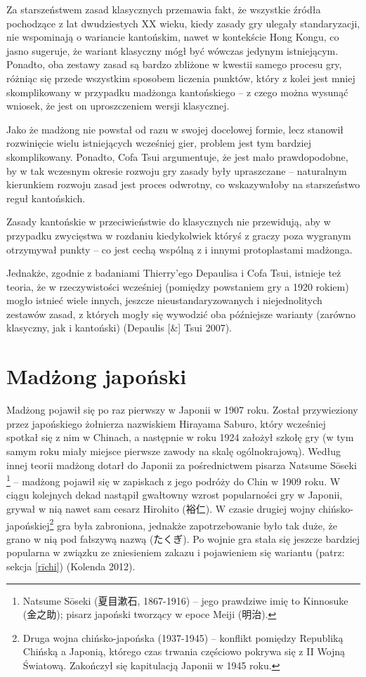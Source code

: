 Za starszeństwem zasad klasycznych przemawia fakt, że wszystkie źródła
pochodzące z lat dwudziestych XX wieku, kiedy zasady gry ulegały standaryzacji,
nie wspominają o wariancie kantońskim, nawet w kontekście Hong Kongu,
co jasno sugeruje, że wariant klasyczny mógł być wówczas jedynym istniejącym.
Ponadto, oba zestawy zasad są bardzo zbliżone w kwestii samego procesu gry,
różniąc się przede wszystkim sposobem liczenia punktów, który z kolei jest mniej
skomplikowany w przypadku madżonga kantońskiego -- z czego można wysunąć
wniosek, że jest on uproszczeniem wersji klasycznej.

Jako że madżong nie powstał od razu w swojej docelowej formie, lecz stanowił
rozwinięcie wielu istniejących wcześniej gier, problem jest tym bardziej
skomplikowany. Ponadto, Cofa Tsui argumentuje, że jest mało prawdopodobne, by w
tak wczesnym okresie rozwoju gry zasady były upraszczane -- naturalnym
kierunkiem rozwoju zasad jest proces odwrotny, co wskazywałoby na starszeństwo
reguł kantońskich.

Zasady kantońskie w przeciwieństwie do klasycznych nie przewidują, aby w
przypadku zwycięstwa w rozdaniu kiedykolwiek któryś z graczy poza wygranym
otrzymywał punkty -- co jest cechą wspólną z  i innymi
protoplastami madżonga. 

Jednakże, zgodnie z badaniami Thierry'ego Depaulisa i Cofa Tsui, istnieje też
teoria, że w rzeczywistości wcześniej (pomiędzy powstaniem gry a 1920 rokiem)
mogło istnieć wiele innych, jeszcze nieustandaryzowanych i niejednolitych
zestawów zasad, z których mogły się wywodzić oba późniejsze warianty (zarówno
klasyczny, jak i kantoński) (Depaulis [\&] Tsui 2007).

\section{Madżong japoński}
Madżong pojawił się po raz pierwszy w Japonii w 1907 roku. Został przywieziony
przez japońskiego żołnierza nazwiskiem Hirayama Saburo, który wcześniej spotkał
się z nim w Chinach, a następnie w roku 1924 założył szkołę gry (w tym samym
roku miały miejsce pierwsze zawody na skalę ogólnokrajową). Według innej teorii
madżong dotarł do Japonii za pośrednictwem pisarza Natsume Sōseki
\footnote{Natsume Sōseki (夏目漱石, 1867-1916) -- jego prawdziwe imię to Kinnosuke
(金之助); pisarz japoński tworzący w epoce Meiji (明治).} -- madżong pojawił się w
zapiskach z jego podróży do Chin w 1909 roku. W ciągu kolejnych dekad nastąpił
gwałtowny wzrost popularności gry w Japonii, grywał w nią nawet sam cesarz
Hirohito (裕仁). W czasie drugiej wojny chińsko-japońskiej\footnote{Druga wojna
chińsko-japońska (1937-1945) -- konflikt pomiędzy Republiką Chińską a Japonią,
którego czas trwania częściowo pokrywa się z II Wojną Światową. Zakończył się
kapitulacją Japonii w 1945 roku.} gra była zabroniona, jednakże zapotrzebowanie
było tak duże, że grano w nią pod fałszywą nazwą  (たくぎ). Po
wojnie gra stała się jeszcze bardziej popularna w związku ze zniesieniem zakazu
i pojawieniem się wariantu  (patrz: sekcja \ref{rīchi}) (Kolenda
2012).

